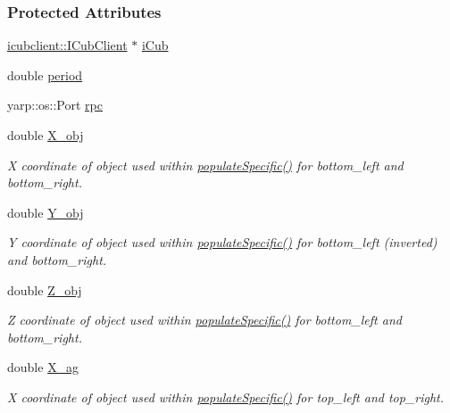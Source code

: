 \subsubsection*{Protected Attributes}
\begin{DoxyCompactItemize}
\item 
\hyperlink{group__icubclient__clients_classicubclient_1_1ICubClient}{icubclient\+::\+I\+Cub\+Client} $\ast$ \hyperlink{group__opcPopulator_ae91ad173bd26955fced3acbd7955e860}{i\+Cub}
\item 
double \hyperlink{group__opcPopulator_a899c2fd9b44a6d91bae7e393dab25301}{period}
\item 
yarp\+::os\+::\+Port \hyperlink{group__opcPopulator_a7e160f62f4024857d8175ac8292bc0e6}{rpc}
\item 
double \hyperlink{group__opcPopulator_a5eb44c3b76f843da34dde2cf8976ddaf}{X\+\_\+obj}
\begin{DoxyCompactList}\small\item\em X coordinate of object used within \hyperlink{group__opcPopulator_a0fba845edd63a15da94b864022d20ba3}{populate\+Specific()} for bottom\+\_\+left and bottom\+\_\+right. \end{DoxyCompactList}\item 
double \hyperlink{group__opcPopulator_afa134f43a94a563ea0be367d3bd956f7}{Y\+\_\+obj}
\begin{DoxyCompactList}\small\item\em Y coordinate of object used within \hyperlink{group__opcPopulator_a0fba845edd63a15da94b864022d20ba3}{populate\+Specific()} for bottom\+\_\+left (inverted) and bottom\+\_\+right. \end{DoxyCompactList}\item 
double \hyperlink{group__opcPopulator_a5c6e50b6ea1a2112bbe8b484bee1a0b5}{Z\+\_\+obj}
\begin{DoxyCompactList}\small\item\em Z coordinate of object used within \hyperlink{group__opcPopulator_a0fba845edd63a15da94b864022d20ba3}{populate\+Specific()} for bottom\+\_\+left and bottom\+\_\+right. \end{DoxyCompactList}\item 
double \hyperlink{group__opcPopulator_ab1ea488289622582f9f3ffaeb39845cf}{X\+\_\+ag}
\begin{DoxyCompactList}\small\item\em X coordinate of object used within \hyperlink{group__opcPopulator_a0fba845edd63a15da94b864022d20ba3}{populate\+Specific()} for top\+\_\+left and top\+\_\+right. \end{DoxyCompactList}\item 

\end{DoxyCompactItemize}
